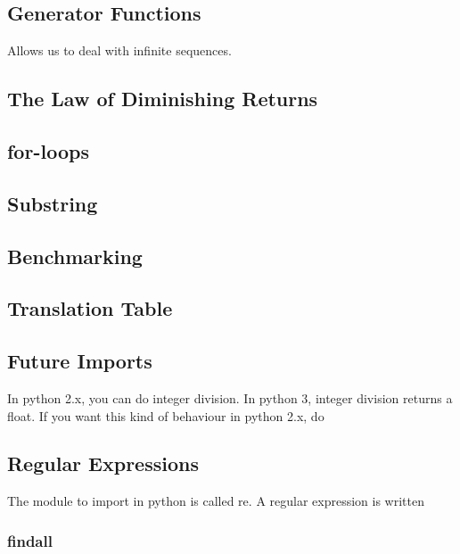 \documentclass[12pt]{article}
\begin{document}


\subsection{Generator Functions}

Allows us to deal with infinite sequences.



\subsection{The Law of Diminishing Returns}

\subsection{for-loops}


\subsection{Substring}


\subsection{Benchmarking}


\subsection{Translation Table}


\subsection{Future Imports}

In python 2.x, you can do integer division. In python 3, integer division returns a float. If you want this kind of behaviour in python 2.x, do



\subsection{Regular Expressions}
The module to import in python is called re. A regular expression is written

\subsubsection{findall}

\end{document}
